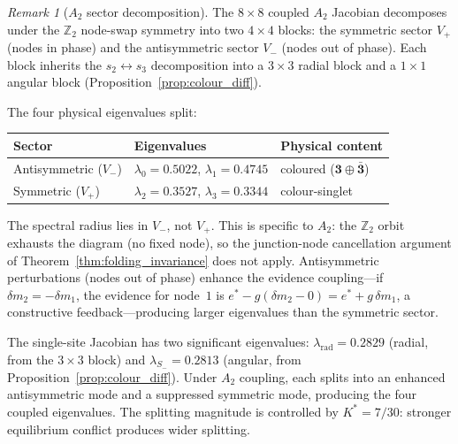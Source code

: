 \documentclass[11pt,a4paper]{article}
\let\hline\midrule
\theoremstyle{definition}
\theoremstyle{remark}
\newtheorem{remark}[theorem]{Remark}
\newcommand{\Z}{\mathbb{Z}}
\begin{document}
\begin{remark}[$A_2$ sector decomposition]\label{rem:A2_sectors}
The $8\times 8$ coupled $A_2$ Jacobian decomposes under the $\Z_2$ node-swap symmetry into two $4\times 4$ blocks: the symmetric sector $V_+$ (nodes in phase) and the antisymmetric sector $V_-$ (nodes out of phase). Each block inherits the $s_2\leftrightarrow s_3$ decomposition into a $3\times 3$ radial block and a $1\times 1$ angular block (Proposition~\ref{prop:colour_diff}).

The four physical eigenvalues split:
\begin{center}
\begin{tabular}{lll}
\hline
Sector & Eigenvalues & Physical content \\
\hline
Antisymmetric ($V_-$) & $\lambda_0=0.5022$, $\lambda_1=0.4745$ & coloured ($\mathbf{3}\oplus\bar{\mathbf{3}}$) \\
Symmetric ($V_+$) & $\lambda_2=0.3527$, $\lambda_3=0.3344$ & colour-singlet \\
\hline
\end{tabular}
\end{center}
The spectral radius lies in $V_-$, not $V_+$. This is specific to $A_2$: the $\Z_2$ orbit exhausts the diagram (no fixed node), so the junction-node cancellation argument of Theorem~\ref{thm:folding_invariance} does not apply. Antisymmetric perturbations (nodes out of phase) enhance the evidence coupling---if $\delta m_2=-\delta m_1$, the evidence for node~$1$ is $e^*-g(\delta m_2-0)=e^*+g\,\delta m_1$, a constructive feedback---producing larger eigenvalues than the symmetric sector.

The single-site Jacobian has two significant eigenvalues: $\lambda_{\mathrm{rad}}=0.2829$ (radial, from the $3\times 3$ block) and $\lambda_{S_-}=0.2813$ (angular, from Proposition~\ref{prop:colour_diff}). Under $A_2$ coupling, each splits into an enhanced antisymmetric mode and a suppressed symmetric mode, producing the four coupled eigenvalues. The splitting magnitude is controlled by $K^*=7/30$: stronger equilibrium conflict produces wider splitting.
\end{remark}
\end{document}
